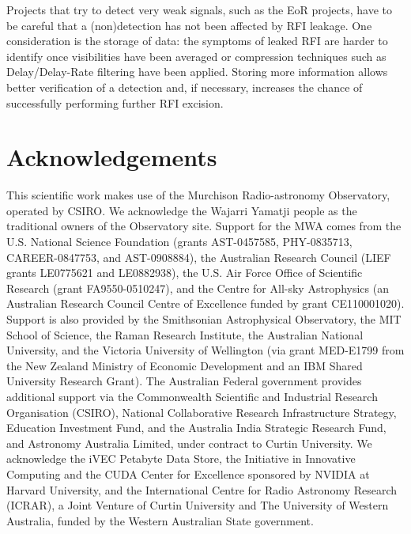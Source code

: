 \documentclass{pasa}
\DeclareRobustCommand{\TUSSEN}[3]{#2}
\begin{document}
Projects that try to detect very weak signals, such as the EoR projects, have to be careful that a (non)detection has not been affected by RFI leakage. One consideration is the storage of data: the symptoms of leaked RFI are harder to identify once visibilities have been averaged or compression techniques such as Delay/Delay-Rate filtering \citep{parsons-paper-eorlimit-2014} have been applied. Storing more information allows better verification of a detection and, if necessary, increases the chance of successfully performing further RFI excision.

\section*{Acknowledgements}
This scientific work makes use of the Murchison Radio-astronomy Observatory, operated by CSIRO. We acknowledge the Wajarri Yamatji people as the traditional owners of the Observatory site. Support for the MWA comes from the U.S. National Science Foundation (grants AST-0457585, PHY-0835713, CAREER-0847753, and AST-0908884), the Australian Research Council (LIEF grants LE0775621 and LE0882938), the U.S. Air Force Office of Scientific Research (grant FA9550-0510247), and the Centre for All-sky Astrophysics (an Australian Research Council Centre of Excellence funded by grant CE110001020). Support is also provided by the Smithsonian Astrophysical Observatory, the MIT School of Science, the Raman Research Institute, the Australian National University, and the Victoria University of Wellington (via grant MED-E1799 from the New Zealand Ministry of Economic Development and an IBM Shared University Research Grant). The Australian Federal government provides additional support via the Commonwealth Scientific and Industrial Research Organisation (CSIRO), National Collaborative Research Infrastructure Strategy, Education Investment Fund, and the Australia India Strategic Research Fund, and Astronomy Australia Limited, under contract to Curtin University. We acknowledge the iVEC Petabyte Data Store, the Initiative in Innovative Computing and the CUDA Center for Excellence sponsored by NVIDIA at Harvard University, and the International Centre for Radio Astronomy Research (ICRAR), a Joint Venture of Curtin University and The University of Western Australia, funded by the Western Australian State government. 

\DeclareRobustCommand{\TUSSEN}[3]{#3}



\label{lastpage}
\end{document}

